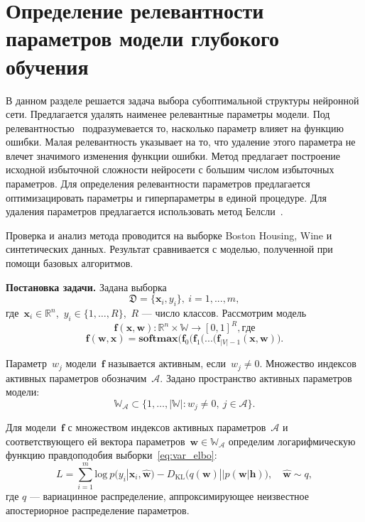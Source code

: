 





























\section{Определение релевантности параметров модели глубокого обучения}
В данном разделе решается задача выбора субоптимальной структуры нейронной сети. Предлагается удалять наименее релевантные параметры модели. Под релевантностью~\cite{nips} подразумевается то, насколько параметр влияет на функцию ошибки. Малая релевантность указывает на то, что удаление этого параметра не влечет значимого изменения функции ошибки. Метод предлагает построение исходной избыточной сложности нейросети с большим числом избыточных параметров. Для определения релевантности параметров предлагается оптимизацировать параметры и гиперпараметры в единой процедуре. Для удаления параметров предлагается использовать метод Белсли~\cite{neychev}.

Проверка и анализ метода проводится на выборке Boston Housing, Wine и синтетических данных. Результат сравнивается с моделью, полученной при помощи базовых алгоритмов.

\textbf{Постановка задачи. } 
Задана выборка
$$\mathfrak{D} = \{\textbf{x}_i,y_i\},~ i =1,...,m,$$
где~$\textbf{x}_i \in \mathbb{R}^{n}$,~$y_i \in \{1, \dots, R\}$,~$R$ --- число классов.
Рассмотрим модель~$$\mathbf{f}(\mathbf{x}, \mathbf{w}): \mathbb{R}^n \times \mathbb{W} \to [0,1]^R, где$$
$$\mathbf{f}(\mathbf{w}, \mathbf{x}) = \textbf{softmax}\bigl( \mathbf{f}_0(\mathbf{f}_1(...(\mathbf{f}_{|V|-1}(\mathbf{x}, \mathbf{w})\bigr).$$

Параметр~$w_j$ модели~$\mathbf{f}$  называется активным, если~$w_j \not = 0$. Множество индексов активных параметров обозначим~$\mathcal{A}$.
Задано пространство активных параметров модели:
$$\mathbb{W}_{\mathcal{A}} \subset \{1, \dots, |\mathbb{W}|:  w_j\not=0,~j \in \mathcal{A}  \}.$$


Для модели~$\mathbf{f}$ с множеством индексов активных параметров~$\mathcal{A}$ и соответствующего ей вектора параметров~$\textbf{w} \in \mathbb{W_\mathcal{A}}$  определим логарифмическую функцию правдоподобия выборки~\eqref{eq:var_elbo}:
\begin{equation}
\label{eq:applied_elbo}
    L = \sum_{i=1}^m \text{log}~p({y}_i|\mathbf{x}_i, \hat{\mathbf{w}}) - D_\text{KL}\bigl(q (\mathbf{w}) || p (\mathbf{w}|\mathbf{h})\bigr),\quad \hat{\mathbf{w}} \sim q,
\end{equation}
где $q$ --- вариацинное распределение, аппроксимирующее неизвестное апостериорное распределение параметров.

